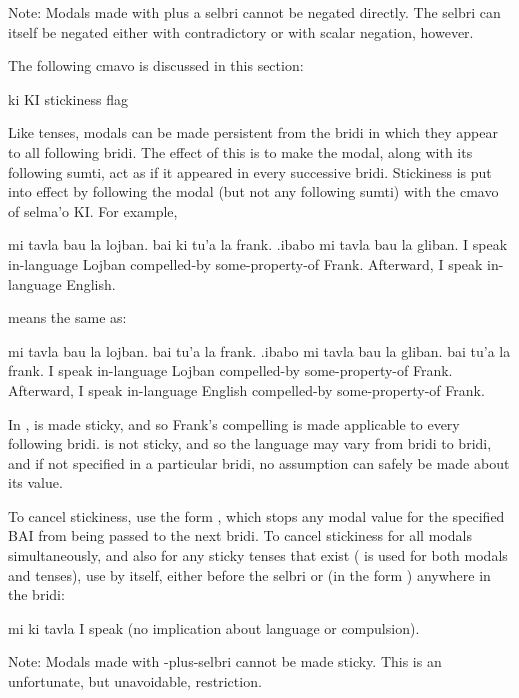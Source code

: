 Note: Modals made with  plus a selbri cannot be
    negated directly. The selbri can itself be negated either with
    contradictory or with scalar negation, however.



The following cmavo is discussed in this section:

   ki  KI  stickiness flag

Like tenses, modals can be made persistent from the bridi in
    which they appear to all following bridi. The effect of this
     is to make the modal, along with its following
    sumti, act as if it appeared in every successive bridi.
    Stickiness is put into effect by following the modal (but not
    any following sumti) with the cmavo  of selma'o KI. For
    example,
\begin{example}
mi tavla bau la lojban.\n
\T	bai ki tu'a la frank.\n
.ibabo mi tavla bau la gliban.\n
I speak in-language Lojban\n
\T	compelled-by some-property-of Frank.\n
Afterward, I speak in-language English.
\end{example}

{\noindent}means the same as:
\begin{example}
mi tavla bau la lojban.\n
\T	bai tu'a la frank.\n
.ibabo mi tavla bau la gliban.\n
\T	bai tu'a la frank.\n
I speak in-language Lojban\n
\T	compelled-by some-property-of Frank.\n
Afterward, I speak in-language English\n
\T	compelled-by some-property-of Frank.
\end{example}

In ,  is made
    sticky, and so Frank's compelling is made applicable to every
    following bridi.  is not sticky, and so the language may
    vary from bridi to bridi, and if not specified in a particular
    bridi, no assumption can safely be made about its value.

To cancel stickiness, use the form , which
    stops any modal value for the specified BAI from being passed
    to the next bridi. To cancel stickiness for all modals
    simultaneously, and also for any sticky tenses that exist
    ( is used for both modals and tenses), use  by
    itself, either before the selbri or (in the form )
    anywhere in the bridi:
\begin{example}
mi ki tavla\n
I speak (no implication about language or compulsion).
\end{example}

Note: Modals made with -plus-selbri cannot be made
    sticky. This is an unfortunate, but unavoidable, restriction.



